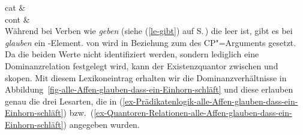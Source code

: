 \ms
{ cat &  \\
  cont &  \\
}
\zs
Während bei Verben wie \emph{geben} (siehe (\ref{le-gibt}) auf S.\,\pageref{le-gibt}) die \hconsl leer ist, gibt es bei \emph{glauben} ein
\qeq-Element. \argtwo von  wird in Beziehung zum \ltopw des CP"=Arguments
gesetzt. Da die beiden Werte nicht identifiziert werden, sondern lediglich eine Dominanzrelation
festgelegt wird, kann der Existenzquantor zwischen  und 
skopen. Mit diesem Lexikoneintrag erhalten wir die Dominanzverhältnisse in
Abbildung~\ref{fig-alle-Affen-glauben-dass-ein-Einhorn-schläft} und diese erlauben genau die drei
Lesarten, die in (\ref{ex-Prädikatenlogik-alle-Affen-glauben-dass-ein-Einhorn-schläft}) bzw.\
(\ref{ex-Quantoren-Relationen-alle-Affen-glauben-dass-ein-Einhorn-schläft}) angegeben wurden.

